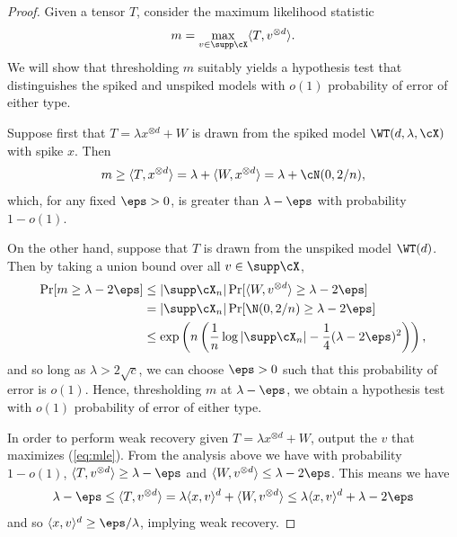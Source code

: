 \documentclass{article}
\begin{document}
\begin{proof}
Given a tensor $T$, consider the maximum likelihood statistic
\begin{equation}
\label{eq:mle}
m = \max_{v \in \supp\cX} \langle T, v^{\otimes d} \rangle.
\end{equation}
We will show that thresholding $m$ suitably yields a hypothesis test that distinguishes the spiked and unspiked models with $o(1)$ probability of error of either type.

Suppose first that $T = \lambda x^{\otimes d} + W$ is drawn from the spiked model $\WT(d,\lambda,\cX)$ with spike $x$. Then
$$ m \geq \langle T, x^{\otimes d} \rangle = \lambda + \langle W, x^{\otimes d} \rangle = \lambda + \cN(0,2/n), $$
which, for any fixed $\eps > 0$, is greater than $\lambda - \eps$ with probability $1 - o(1)$.

On the other hand, suppose that $T$ is drawn from the unspiked model $\WT(d)$. Then by taking a union bound over all $v \in \supp \cX$,
\begin{align*}
    \Pr[m \geq \lambda - 2\eps] &\leq |\supp \cX_n| \Pr[\langle W, v^{\otimes d} \rangle \geq \lambda - 2\eps] \\
    &= |\supp \cX_n| \Pr[ \N(0,2/n) \geq \lambda - 2\eps ] \\
    &\leq \exp\left(n\left(\frac1n \log |\supp \cX_n| - \frac14 (\lambda - 2\eps)^2 \right)\right),
\end{align*}
and so long as $\lambda > 2\sqrt{c}$, we can choose $\eps > 0$ such that this probability of error is $o(1)$. Hence, thresholding $m$ at $\lambda - \eps$, we obtain a hypothesis test with $o(1)$ probability of error of either type.

In order to perform weak recovery given $T = \lambda x^{\otimes d} + W$, output the $v$ that maximizes (\ref{eq:mle}). From the analysis above we have with probability $1-o(1)$, $\langle T,v^{\otimes d} \rangle \ge \lambda - \eps$ and $\langle W,v^{\otimes d} \rangle \le \lambda - 2\eps$. This means we have
$$\lambda - \eps \le \langle T, v^{\otimes d}\rangle = \lambda \langle x,v \rangle^d + \langle W,v^{\otimes d} \rangle \le \lambda \langle x,v \rangle^d + \lambda - 2\eps$$
and so $\langle x,v \rangle^d \ge \eps/\lambda$, implying weak recovery.
\end{proof}
\end{document}
